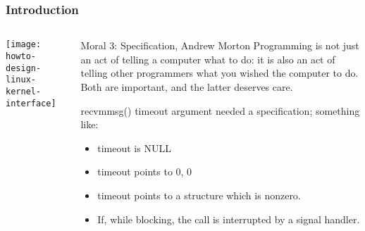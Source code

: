 \begin{frame}[plain]
	\frametitle{Introduction}
	
	
	
	\begin{columns}
		
		\begin{column}{.4\textwidth}
			
			\texttt{[image: howto-design-linux-kernel-interface]}
			
		\end{column}
		
		\begin{column}{.6\textwidth}
			\large
			\begin{block}{Moral 3: Specification, Andrew Morton}
				Programming is not just an act of telling a computer
				what to do: it is also an act of telling other
				programmers what you wished the computer to do.
				Both are important, and the latter deserves care. 
				
				
			\end{block} 
			\normalsize
			recvmmsg() timeout argument needed a specification; something like:
			
			\begin{itemize}
				\item timeout is NULL
				\item timeout points to {0, 0}
				\item timeout points to a structure which is nonzero. 
				\item If, while blocking, the call is interrupted by a signal handler.

			\end{itemize}
		\end{column}
		
		
	\end{columns}
	
	
\end{frame}



